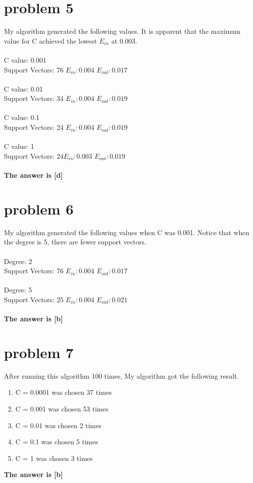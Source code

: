 \documentclass{article}
\begin{document}
\section*{problem 5}
My algorithm generated the following values. It is apparent that the maximum value for C achieved the lowest $E_{in}$ at 0.003.\\\\
C value: 0.001\\
Support Vectors: 76 $E_{in}: 0.004$   $E_{out}: 0.017$
\\\\
C value: 0.01\\
Support Vectors: 34 $E_{in}: 0.004$   $E_{out}: 0.019$
\\\\
C value: 0.1 \\
Support Vectors: 24 $E_{in}: 0.004$   $E_{out}: 0.019$
\\\\ 
C value: 1\\
Support Vectors: $24 E_{in}: 0.003$   $E_{out}: 0.019$
\\\\
\textbf{The answer is [d]}

\section*{problem 6}
My algorithm generated the following values when C was 0.001. Notice that when the degree is 5, there are fewer support vectors.\\\\
Degree: 2\\
Support Vectors: 76 $E_{in}: 0.004$   $E_{out}: 0.017$
\\\\
Degree: 5\\
Support Vectors: 25 $E_{in}: 0.004$   $E_{out}: 0.021$
\\\\
\textbf{The answer is [b]}

\section*{problem 7}
After running this algorithm 100 times, My algorithm got the following result.
\begin{enumerate}[label=(\alph*)]
    \item C = 0.0001 was chosen 37 times
    \item C = 0.001 was chosen 53 times
    \item C = 0.01 was chosen 2 times
    \item C = 0.1 was chosen 5 times
    \item C = 1 was chosen 3 times
\end{enumerate}
\textbf{The answer is [b]}
\end{document}
